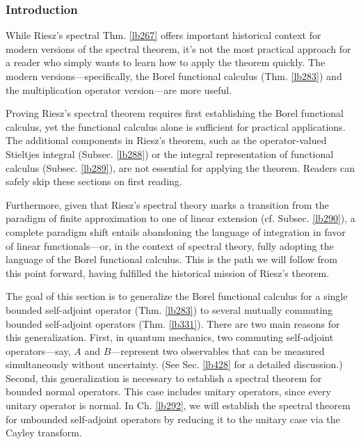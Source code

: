 \documentclass[12pt,b5paper,notitlepage]{article}
\theoremstyle{definition}
\theoremstyle{plain}
\numberwithin{equation}{section}
\begin{document}
\subsubsection{Introduction}


While Riesz's spectral Thm. \ref{lb267} offers important historical context for modern versions of the spectral theorem, it's not the most practical approach for a reader who simply wants to learn how to apply the theorem quickly. The modern versions---specifically, the Borel functional calculus (Thm. \ref{lb283}) and the multiplication operator version---are more useful.

Proving Riesz's spectral theorem requires first establishing the Borel functional calculus, yet the functional calculus alone is sufficient for practical applications. The additional components in Riesz's theorem, such as the operator-valued Stieltjes integral (Subsec. \ref{lb288}) or the integral representation of functional calculus (Subsec. \ref{lb289}), are not essential for applying the theorem. Readers can safely skip these sections on first reading.

Furthermore, given that Riesz's spectral theory marks a transition from the paradigm of finite approximation to one of linear extension (cf. Subsec. \ref{lb290}), a complete paradigm shift entails abandoning the language of integration in favor of linear functionals---or, in the context of spectral theory, fully adopting the language of the Borel functional calculus. This is the path we will follow from this point forward, having fulfilled the historical mission of Riesz's theorem.



The goal of this section is to generalize the Borel functional calculus for a single bounded self-adjoint operator (Thm. \ref{lb283}) to several mutually commuting bounded self-adjoint operators (Thm. \ref{lb331}). There are two main reasons for this generalization. First, in quantum mechanics, two commuting self-adjoint operators---say, $A$ and $B$---represent two observables that can be measured simultaneously without uncertainty. (See Sec. \ref{lb428} for a detailed discussion.) Second, this generalization is necessary to establish a spectral theorem for bounded normal operators. This case includes unitary operators, since every unitary operator is normal. In Ch. \ref{lb292}, we will establish the spectral theorem for unbounded self-adjoint operators by reducing it to the unitary case via the Cayley transform.
\end{document}
